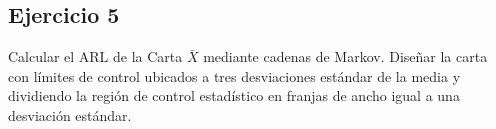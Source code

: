 \documentclass{article}
\begin{document}
\hypertarget{ejercicio-5}{%
\subsection{Ejercicio 5}\label{ejercicio-5}}

Calcular el ARL de la Carta \(\bar{X}\) mediante cadenas de Markov.
Diseñar la carta con límites de control ubicados a tres desviaciones
estándar de la media y dividiendo la región de control estadístico en
franjas de ancho igual a una desviación estándar.



\end{document}
